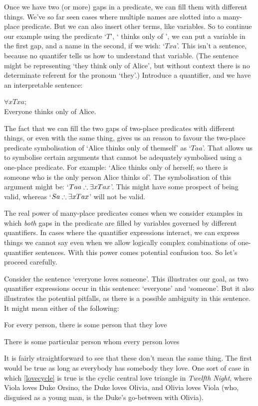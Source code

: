 Once we have two (or more) gaps in a predicate, we can fill them with different things. We've so far seen cases where multiple names are slotted into a many-place predicate. But we can also insert other terms, like variables. So to continue our example using the predicate `$T$', ` thinks only of ', we can put a variable in the first gap, and a name in the second, if we wish: `$Txa$'. This isn't a sentence, because no quantifer tells us how to understand that variable. (The sentence might be representing `they think only of Alice', but without context there is no determinate referent for the pronoun `they'.) Introduce a quantifier, and we have an interpretable sentence: 
\begin{earg}
	\item[\ex{selfi1}] $\forall x Txa$;\\ Everyone thinks only of Alice.
\end{earg}

The fact that we can fill the two gaps of two-place predicates with different things, or even with the same thing, gives us an reason to favour the two-place predicate symbolisation of `Alice thinks only of themself' as `$Taa$'. That allows us to symbolise certain arguments that cannot be adequately symbolised using a one-place predicate. For example: `Alice thinks only of herself; so there is someone who is the only person Alice thinks of'. The symbolisation of this argument might be: `$Taa \mathrel{\therefore} \exists x Tax$'. This might have some prospect of being valid, whereas `$Sa \mathrel{\therefore} \exists x Tax$' will not be valid.

The real power of many-place predicates comes when we consider examples in which \emph{both} gaps in the predicate are filled by variables governed by different quantifiers. In cases where the quantifier expressions interact, we can express things we cannot say even when we allow logically complex combinations of one-quantifier sentences. With this power comes potential confusion too. So let's proceed carefully. 

Consider the sentence `everyone loves someone'. This illustrates our goal, as two quantifier expressions occur in this sentence: `everyone' and `someone'. But it also illustrates the potential pitfalls, as there is a possible ambiguity in this sentence. It might mean either of the following:
	\begin{earg}
		\item[\ex{lovecycle}] For every person, there is some person that they love
		\item[\ex{loveconverge}] There is some particular person whom every person loves
	\end{earg} It is fairly straightforward to see that these don't mean the same thing. The first would be true as long as everybody has somebody they love. One sort of case in which \ref{lovecycle} is true is the cyclic central love triangle in \emph{Twelfth Night}, where Viola loves Duke Orsino, the Duke loves Olivia, and Olivia loves Viola (who, disguised as a young man, is the Duke's go-between with Olivia). 

